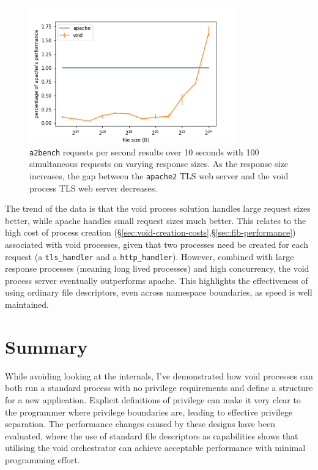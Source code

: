 \documentclass[12pt,a4paper,twoside]{report}
\begin{document}
\begin{figure}
    \centering
    \includegraphics[width=0.8\textwidth]{graphs/tls_relative_performance.png}

    \caption{\texttt{a2bench} requests per second results over 10 seconds with 100 simultaneous requests on varying response sizes. As the response size increases, the gap between the \texttt{apache2} TLS web server and the void process TLS web server decreases.}
    \label{fig:tls-relative-performance}
\end{figure}

The trend of the data is that the void process solution handles large request sizes better, while apache handles small request sizes much better. This relates to the high cost of process creation (§\ref{sec:void-creation-costs},§\ref{sec:fib-performance}) associated with void processes, given that two processes need be created for each request (a \texttt{tls\_handler} and a \texttt{http\_handler}). However, combined with large response processes (meaning long lived processes) and high concurrency, the void process server eventually outperforms apache. This highlights the effectiveness of using ordinary file descriptors, even across namespace boundaries, as speed is well maintained. 

\section{Summary}

While avoiding looking at the internals, I've demonstrated how void processes can both run a standard process with no privilege requirements and define a structure for a new application. Explicit definitions of privilege can make it very clear to the programmer where privilege boundaries are, leading to effective privilege separation. The performance changes caused by these designs have been evaluated, where the use of standard file descriptors as capabilities shows that utilising the void orchestrator can achieve acceptable performance with minimal programming effort.
\end{document}
